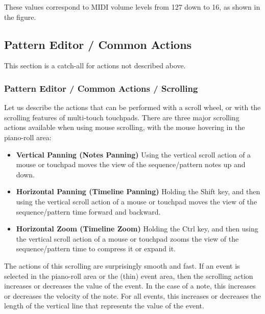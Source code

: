    These values correspond to MIDI volume levels from 127 down to 16, as
   shown in the figure.

\subsection{Pattern Editor / Common Actions}
\label{subsec:seq64_pattern_editor_common}

   This section is a catch-all for actions not described above.

\subsubsection{Pattern Editor / Common Actions / Scrolling}
\label{subsec:seq64_pattern_editor_scrolling}

   Let us describe the actions that can be performed with a
   scroll wheel, or with the scrolling features of multi-touch touchpads.
   There are three major scrolling actions available when using mouse
   scrolling, with the mouse hovering in the piano-roll area:

   \begin{itemize}
      \item \textbf{Vertical Panning (Notes Panning)}
         Using the vertical scroll action of a mouse or touchpad moves the
         view of the sequence/pattern notes up and down.
      \item \textbf{Horizontal Panning (Timeline Panning)}
         Holding the Shift key, and then using the vertical scroll action of a
         mouse or touchpad moves the view of the sequence/pattern time forward
         and backward.
      \item \textbf{Horizontal Zoom (Timeline Zoom)}
         Holding the Ctrl key, and then using the vertical scroll action of a
         mouse or touchpad zooms the view of the sequence/pattern time to
         compress it or expand it.
   \end{itemize}

   The actions of this scrolling are surprisingly smooth and fast.
   If an event is selected in the piano-roll area or the (thin) event area,
   then the scrolling action increases or decreases the value of the event.
   In the case of a note, this increases or decreases the velocity of the note.
   For all events, this increases or decreases the length of the vertical line
   that represents the value of the event.

